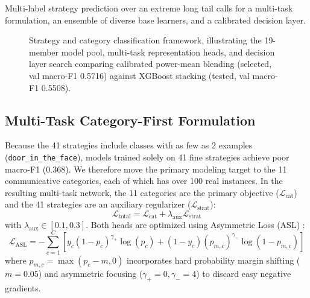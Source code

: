 Multi-label strategy prediction over an extreme long tail calls for a multi-task formulation, an ensemble of diverse base learners, and a calibrated decision layer.

\begin{figure}[htbp]
  \centering
  \resizebox{\textwidth}{!}{}
  \caption{Strategy and category classification framework, illustrating the 19-member model pool, multi-task representation heads, and decision layer search comparing calibrated power-mean blending (selected, val macro-F1 0.5716) against XGBoost stacking (tested, val macro-F1 0.5508).}
  \label{fig:strategy_model}
\end{figure}

\subsection{Multi-Task Category-First Formulation}
Because the 41 strategies include classes with as few as 2 examples (\texttt{door\_in\_the\_face}), models trained solely on 41 fine strategies achieve poor macro-F1 ($0.368$). We therefore move the primary modeling target to the 11 communicative categories, each of which has over 100 real instances. In the resulting multi-task network, the 11 categories are the primary objective ($\mathcal{L}_{\text{cat}}$) and the 41 strategies are an auxiliary regularizer ($\mathcal{L}_{\text{strat}}$):
\begin{equation}
  \mathcal{L}_{\text{total}} = \mathcal{L}_{\text{cat}} + \lambda_{\text{aux}} \mathcal{L}_{\text{strat}}
\end{equation}
with $\lambda_{\text{aux}} \in [0.1, 0.3]$. Both heads are optimized using Asymmetric Loss (ASL) \cite{benbaruch2021asymmetric}:
\begin{equation}
  \mathcal{L}_{\text{ASL}} = -\sum_{c=1}^{C} \left[ y_c (1 - p_c)^{\gamma_+} \log(p_c) + (1 - y_c) (p_{m,c})^{\gamma_-} \log(1 - p_{m,c}) \right]
\end{equation}
where $p_{m,c} = \max(p_c - m, 0)$ incorporates hard probability margin shifting ($m=0.05$) and asymmetric focusing ($\gamma_+ = 0, \gamma_- = 4$) to discard easy negative gradients.

